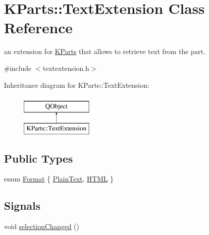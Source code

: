 \hypertarget{classKParts_1_1TextExtension}{\section{K\+Parts\+:\+:Text\+Extension Class Reference}
\label{classKParts_1_1TextExtension}
}


an extension for \hyperlink{namespaceKParts}{K\+Parts} that allows to retrieve text from the part.  




{\ttfamily \#include $<$textextension.\+h$>$}

Inheritance diagram for K\+Parts\+:\+:Text\+Extension\+:\begin{figure}[H]
\begin{center}
\leavevmode
\includegraphics[height=2.000000cm]{classKParts_1_1TextExtension}
\end{center}
\end{figure}
\subsection*{Public Types}
\begin{DoxyCompactItemize}
\item 
enum \hyperlink{classKParts_1_1TextExtension_a65ad08598c74eae19f0c7772a251685d}{Format} \{ \hyperlink{classKParts_1_1TextExtension_a65ad08598c74eae19f0c7772a251685da8bb1bd219fcb9237fae7b81b6d640f96}{Plain\+Text}, 
\hyperlink{classKParts_1_1TextExtension_a65ad08598c74eae19f0c7772a251685da330994e99d37a75f3720547767822f37}{H\+T\+M\+L}
 \}
\end{DoxyCompactItemize}
\subsection*{Signals}
\begin{DoxyCompactItemize}
\item 
void \hyperlink{classKParts_1_1TextExtension_a4d5e1cb28d1faa2dbccef3bb41c058f9}{selection\+Changed} ()
\end{DoxyCompactItemize}
